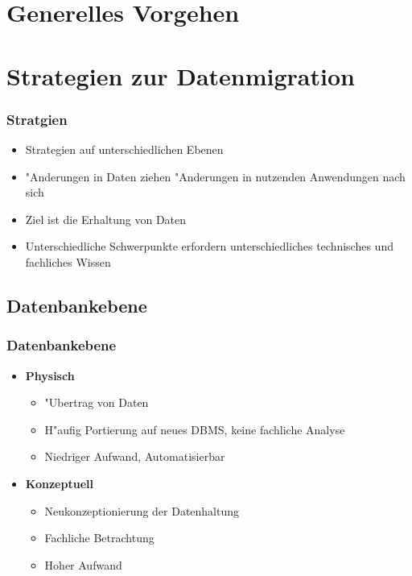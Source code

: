 \documentclass{beamer}
\begin{document}
	\section{Generelles Vorgehen}
	
	\section{Strategien zur Datenmigration}
	
	\begin{frame}
		\frametitle{Stratgien}
		
		\begin{itemize}
			\item Strategien auf unterschiedlichen Ebenen
			\item "Anderungen in Daten ziehen "Anderungen in nutzenden Anwendungen nach sich
			\item Ziel ist die Erhaltung von Daten
			\item Unterschiedliche Schwerpunkte erfordern unterschiedliches technisches und fachliches Wissen
		\end{itemize}
	\end{frame}
	
	\subsection{Datenbankebene}
	
	\begin{frame}
		\frametitle{Datenbankebene}
		
		\begin{itemize}
			\item \textbf{Physisch}
				\begin{itemize}
					\item "Ubertrag von Daten
					\item H"aufig Portierung auf neues DBMS, keine fachliche Analyse
					\item Niedriger Aufwand, Automatisierbar
				\end{itemize}
			\item \textbf{Konzeptuell}
				\begin{itemize}
					\item Neukonzeptionierung der Datenhaltung
					\item Fachliche Betrachtung
					\item Hoher Aufwand
				\end{itemize}
		\end{itemize}
	\end{frame}	
	
\end{document}
